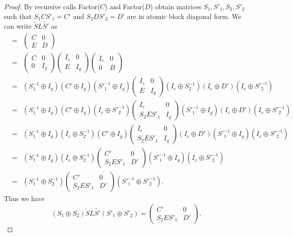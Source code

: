 \documentclass[10pt,a4paper]{article}
\begin{document}
\begin{proof}
By recursive calls Factor($C$) and Factor($D$) obtain matrices $S_1,
S'_1, S_2, S'_2$ such that $S_1C S'_1=C'$ and $S_2 D S'_2=D'$ are in
atomic block diagonal form.  We can write $\tilde{S}L\tilde{S'}$ as
\begin{eqnarray*}
&=& \left(
\begin{array}{cc}
C & 0 \\
E & D
\end{array}
\right)\\
&=& \left(
\begin{array}{cc}
C & 0 \\
0 & I_g
\end{array}
\right)\left(
\begin{array}{cc}
I_e & 0 \\
E & I_g
\end{array}
\right)\left(
\begin{array}{cc}
I_e & 0 \\
0 & B
\end{array}
\right)\\
&=& (S_1^{-1} \oplus I_g)(C' \oplus I_g)({S'}_1^{-1} \oplus I_g)\left(
\begin{array}{cc}
I_e & 0 \\
E & I_g
\end{array}
\right)(I_e \oplus S_2^{-1})(I_e \oplus D')(I_e \oplus {S'}_2^{-1})\\
&=&  (S_1^{-1} \oplus I_g)(C' \oplus I_g)(I_e \oplus {S'}_2^{-1})\left(
\begin{array}{cc}
I_e & 0 \\
S_2ES'_1 & I_g
\end{array}
\right)({S'}_1^{-1}\oplus I_g)(I_e \oplus D')(I_e \oplus {S'}_2^{-1})\\
&=& (S_1^{-1} \oplus I_g)(I_e \oplus S_2^{-1})(C' \oplus I_g)\left(
\begin{array}{cc}
I_e & 0 \\
S_2ES'_1 & I_g
\end{array}
\right)(I_e \oplus D')({S'}_1^{-1}\oplus I_g)(I_e \oplus {S'}_2^{-1})\\
&=& (S_1^{-1} \oplus I_g)(I_e \oplus S_2^{-1})\left(
\begin{array}{cc}
C' & 0 \\
S_2ES'_1 & D'
\end{array}
\right)({S'}_1^{-1}\oplus I_g)(I_e \oplus {S'}_2^{-1})\\
&=& (S_1^{-1} \oplus S_2^{-1})\left(
\begin{array}{cc}
C' & 0 \\
S_2ES'_1 & D'
\end{array}
\right)({S'}_1^{-1}\oplus {S'}_2^{-1}).
\end{eqnarray*}
Thus we have
\[
(S_1 \oplus S_2) \tilde{S}L\tilde{S'}(S'_1 \oplus S'_2) = \left(
\begin{array}{cc}
C' & 0 \\
S_2ES'_1 & D'
\end{array}
\right).
\]


\end{proof}
\end{document}
